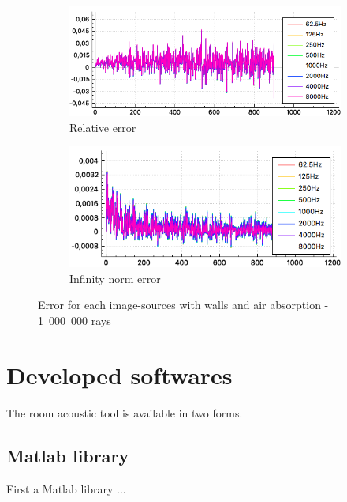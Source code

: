 \documentclass[AMA,STIX1COL]{WileyNJD-v2}
\begin{document}
\begin{figure}[h]
\centering
	\begin{subfigure}{0.49\textwidth}
		\includegraphics[width=\linewidth]{test3_8}
		\caption{Relative error}
		\label{test3_8}
	\end{subfigure}
	\begin{subfigure}{0.49\textwidth}
		\includegraphics[width=\linewidth]{test3_9}
		\caption{Infinity norm error}
		\label{test3_9}
	\end{subfigure}
	\caption{Error for each image-sources with walls and air absorption - 1~000~000 rays}
\end{figure}


\newpage

\section{Developed softwares }\label{sec6}

The room acoustic tool is available in two forms. 

\subsection{Matlab library}
First a Matlab library \cite{gypsilab} ... \\
\end{document}
